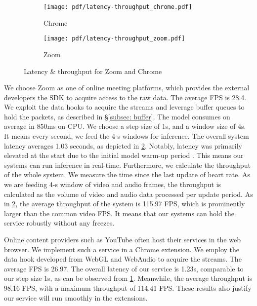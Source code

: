 \begin{figure}[t]
    \centering

    \begin{minipage}{0.8\linewidth}
        \begin{subfigure}{0.49\linewidth}
            \texttt{[image: pdf/latency-throughput\_chrome.pdf]}
            \caption{Chrome}
            \label{subfig:inference_chrome}
        \end{subfigure}\hfill
        \begin{subfigure}{0.49\linewidth}
            \texttt{[image: pdf/latency-throughput\_zoom.pdf]} %
            \caption{Zoom}
            \label{subfig: inference_zoom}
        \end{subfigure}
    \end{minipage}
    \caption{Latency \& throughput for Zoom and Chrome}
    \label{fig: res_througput}
\end{figure}
We choose Zoom as one of online meeting platforms, which provides the external developers the SDK to acquire access to the raw data. The average FPS is 28.4. We exploit the data hooks to acquire the streams and leverage buffer queues to hold the packets, as described in \S\ref{subsec: buffer}. The model consumes on average in 850ms on CPU. We choose a step size of 1s, and a window size of 4s. It means every second, we feed the 4-s windows for inference. The overall system latency averages 1.03 seconds, as depicted in \fig\ref{subfig: inference_zoom}. Notably, latency was primarily elevated at the start due to the initial model warm-up period \cite{lion2016don}. This means our systems can run inference in real-time.
Furthermore, we calculate the throughput of the whole system. We measure the time since the last update of heart rate. As we are feeding 4-s window of video and audio frames, the throughput is calculated as the volume of video and audio data processed per update period. As in \fig\ref{subfig: inference_zoom}, the average throughput of the system is 115.97 FPS, which is prominently larger than the common video FPS. It means that our systems can hold the service robustly without any freezes.

Online content providers such as YouTube often host their services in the web browser. We implement such a service in a Chrome extension. We employ the data hook developed from WebGL and WebAudio to acquire the streams. The average FPS is 26.97. The overall latency of our service is 1.23s, comparable to our step size 1s, as can be observed from \fig\ref{subfig:inference_chrome}. Meanwhile, the average throughput is 98.16 FPS, with a maximum throughput of 114.41 FPS. These results also justify our service will run smoothly in the extensions.



